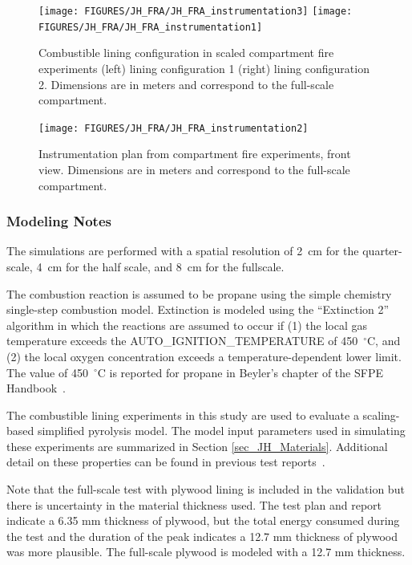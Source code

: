 \begin{figure}[h!]
\texttt{[image: FIGURES/JH\_FRA/JH\_FRA\_instrumentation3]}
\texttt{[image: FIGURES/JH\_FRA/JH\_FRA\_instrumentation1]} \\
\caption[Combustible lining configuration in scaled compartment fire experiments]{Combustible lining configuration in scaled compartment fire experiments (left) lining configuration 1 (right) lining configuration 2. Dimensions are in meters and correspond to the full-scale compartment.}
\label{JH_FRA_lining_fig}
\end{figure}

\begin{figure}[h!]
\texttt{[image: FIGURES/JH\_FRA/JH\_FRA\_instrumentation2]}
\caption[Instrumentation plan from compartment fire experiments]{Instrumentation plan from compartment fire experiments, front view. Dimensions are in meters and correspond to the full-scale compartment.}
\label{JH_FRA_instrumentation_fig}
\end{figure}

\FloatBarrier

\subsubsection{Modeling Notes}

The simulations are performed with a spatial resolution of 2~cm for the quarter-scale, 4~cm for the half scale, and 8~cm for the fullscale.

The combustion reaction is assumed to be propane using the simple chemistry single-step combustion model.
Extinction is modeled using the ``Extinction 2'' algorithm in which the reactions are assumed to occur if (1) the local gas temperature exceeds the {\ct AUTO\_IGNITION\_TEMPERATURE} of 450~$^\circ$C, and (2) the local oxygen concentration exceeds a temperature-dependent lower limit. The value of 450~$^\circ$C is reported for propane in Beyler's chapter of the SFPE Handbook~\cite{SFPE:Beyler}.

The combustible lining experiments in this study are used to evaluate a scaling-based simplified pyrolysis model.
The model input parameters used in simulating these experiments are summarized in Section \ref{sec_JH_Materials}.
Additional detail on these properties can be found in previous test reports~\cite{Luo:FRA2019,Lattimer:NIJ19}.

Note that the full-scale test with plywood lining is included in the validation but there is uncertainty in the material thickness used.
The test plan and report indicate a 6.35 mm thickness of plywood, but the total energy consumed during the test and the duration of the peak indicates a 12.7 mm thickness of plywood was more plausible.
The full-scale plywood is modeled with a 12.7 mm thickness.


